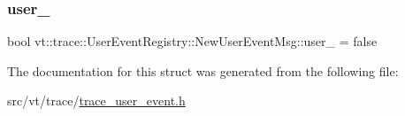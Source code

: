 \subsubsection{\texorpdfstring{user\+\_\+}{user\_}}
{\footnotesize\ttfamily bool vt\+::trace\+::\+User\+Event\+Registry\+::\+New\+User\+Event\+Msg\+::user\+\_\+ = false}



The documentation for this struct was generated from the following file\+:\begin{DoxyCompactItemize}
\item 
src/vt/trace/\hyperlink{trace__user__event_8h}{trace\+\_\+user\+\_\+event.\+h}\end{DoxyCompactItemize}
